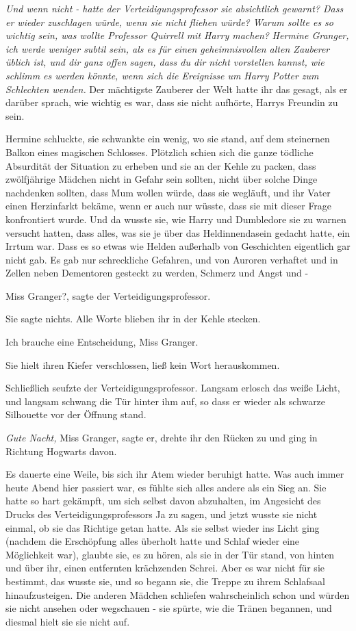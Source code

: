 \emph{Und wenn nicht - hatte der Verteidigungsprofessor sie absichtlich gewarnt?
Dass er wieder zuschlagen würde, wenn sie nicht fliehen würde? Warum sollte es
so wichtig sein, was wollte Professor Quirrell mit Harry machen?} \emph{Hermine
Granger, ich werde weniger subtil sein, als es für einen geheimnisvollen alten
Zauberer üblich ist, und dir ganz offen sagen, dass du dir nicht vorstellen
kannst, wie schlimm es werden könnte, wenn sich die Ereignisse um Harry Potter
zum Schlechten wenden.} Der mächtigste Zauberer der Welt hatte ihr das gesagt,
als er darüber sprach, wie wichtig es war, dass sie nicht aufhörte, Harrys
Freundin zu sein.

Hermine schluckte, sie schwankte ein wenig, wo sie stand, auf dem steinernen
Balkon eines magischen Schlosses. Plötzlich schien sich die ganze tödliche
Absurdität der Situation zu erheben und sie an der Kehle zu packen, dass
zwölfjährige Mädchen nicht in Gefahr sein sollten, nicht über solche Dinge
nachdenken sollten, dass Mum wollen würde, dass sie wegläuft, und ihr Vater
einen Herzinfarkt bekäme, wenn er auch nur wüsste, dass sie mit dieser Frage
konfrontiert wurde. Und da wusste sie, wie Harry und Dumbledore sie zu warnen
versucht hatten, dass alles, was sie je über das Heldinnendasein gedacht hatte,
ein Irrtum war. Dass es so etwas wie Helden außerhalb von Geschichten eigentlich
gar nicht gab. Es gab nur schreckliche Gefahren, und von Auroren verhaftet und
in Zellen neben Dementoren gesteckt zu werden, Schmerz und Angst und -

\glqq{}Miss Granger?\grqq{}, sagte der Verteidigungsprofessor.

Sie sagte nichts. Alle Worte blieben ihr in der Kehle stecken.

\glqq{}Ich brauche eine Entscheidung, Miss Granger.\grqq{}

Sie hielt ihren Kiefer verschlossen, ließ kein Wort herauskommen.

Schließlich seufzte der Verteidigungsprofessor. Langsam erlosch das weiße Licht,
und langsam schwang die Tür hinter ihm auf, so dass er wieder als schwarze
Silhouette vor der Öffnung stand.

\glqq{}\emph{Gute Nacht,} Miss Granger\grqq{}, sagte er, drehte ihr den Rücken zu
und ging in Richtung Hogwarts davon.

Es dauerte eine Weile, bis sich ihr Atem wieder beruhigt hatte. Was auch immer
heute Abend hier passiert war, es fühlte sich alles andere als ein Sieg an. Sie
hatte so hart gekämpft, um sich selbst davon abzuhalten, im Angesicht des Drucks
des Verteidigungsprofessors Ja zu sagen, und jetzt wusste sie nicht einmal, ob
sie das Richtige getan hatte. Als sie selbst wieder ins Licht ging (nachdem die
Erschöpfung alles überholt hatte und Schlaf wieder eine Möglichkeit war),
glaubte sie, es zu hören, als sie in der Tür stand, von hinten und über ihr,
einen entfernten krächzenden Schrei. Aber es war nicht für sie bestimmt, das
wusste sie, und so begann sie, die Treppe zu ihrem Schlafsaal hinaufzusteigen.
Die anderen Mädchen schliefen wahrscheinlich schon und würden sie nicht ansehen
oder wegschauen - sie spürte, wie die Tränen begannen, und diesmal hielt sie sie
nicht auf.

